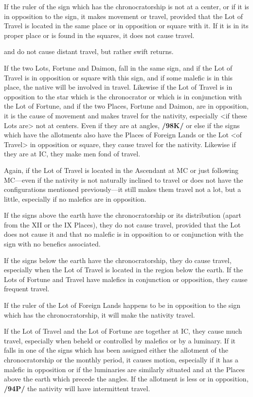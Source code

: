 If the ruler of the sign which has the chronocratorship is not at a center, or if it is in opposition to the sign, it makes movement or travel, provided that the Lot of Travel is located in the same place or in opposition or square with it. If it is in its proper place or is found in the squares, it does
not cause travel.

\Mercury\xspace and \Venus\xspace do not cause distant travel, but rather swift returns. 

If the two Lots, Fortune and Daimon, fall in the same sign, and if the Lot of Travel is in opposition or square with this sign, and if some malefic is in this place, the native will be involved in travel. Likewise if the Lot of Travel is in
opposition to the star which is the chronocrator or which is in conjunction with the Lot of Fortune, and if the two Places, Fortune and Daimon, are in opposition, it is the cause of movement and makes travel for the nativity, especially <if these Lots are> not at centers. Even if they are at angles, \textbf{/98K/} or else if the signs which have the allotments also have the Places of Foreign Lands or the Lot <of Travel> in opposition or square, they cause travel for the nativity. Likewise if they are at IC, they make men fond of
travel. 

Again, if the Lot of Travel is located in the Ascendant at MC or just following MC—even if the nativity is not naturally inclined to travel or does not have the configurations mentioned previously—it still makes them travel not a lot, but a little, especially if no malefics are in opposition.

If the signs above the earth have the chronocratorship or its distribution (apart from the XII or the IX Places), they do not cause travel, provided that the Lot does not cause it and that no malefic is in opposition to or conjunction with the sign with no benefics associated. 

If the signs below the earth have the chronocratorship, they do cause travel, especially when the Lot of Travel is located in the region below the earth. If the Lots of Fortune and Travel have malefics in conjunction or opposition, they cause frequent
travel. 

If the ruler of the Lot of Foreign Lands happens to be in opposition to the sign which has the chronocratorship, it will make the nativity travel. 

If the Lot of Travel and the Lot of Fortune are together at
IC, they cause much travel, especially when beheld or controlled by malefics or by a luminary. If it falls in
one of the signs which has been assigned either the allotment of the chronocratorship or the monthly period, it causes motion, especially if it has a malefic in opposition or if the luminaries are similarly situated and at the Places above the earth which precede the angles. If the allotment is less or in
opposition, \textbf{/94P/} the nativity will have intermittent travel. 

